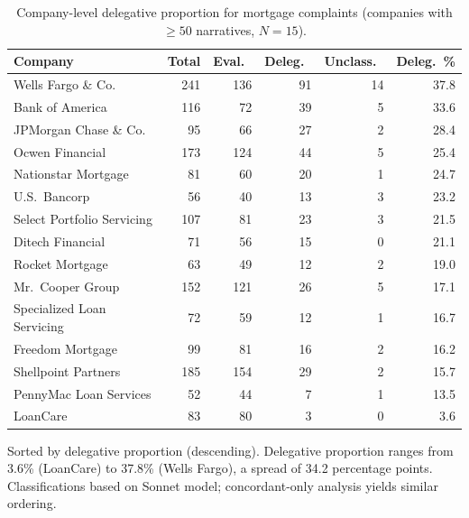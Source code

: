 
\begin{table}[H]
\centering
\begin{threeparttable}
\caption{Company-level delegative proportion for mortgage complaints (companies with $\geq 50$ narratives, $N = 15$).}
\label{tab:supp_company}
\begin{small}
\begin{tabular}{lrrrrr}
\toprule
Company & Total & Eval.\ & Deleg.\ & Unclass.\ & Deleg.\ \% \\
\midrule
Wells Fargo \& Co.          & 241 & 136 & 91 & 14 & 37.8 \\
Bank of America             & 116 &  72 & 39 &  5 & 33.6 \\
JPMorgan Chase \& Co.       &  95 &  66 & 27 &  2 & 28.4 \\
Ocwen Financial             & 173 & 124 & 44 &  5 & 25.4 \\
Nationstar Mortgage         &  81 &  60 & 20 &  1 & 24.7 \\
U.S.\ Bancorp               &  56 &  40 & 13 &  3 & 23.2 \\
Select Portfolio Servicing  & 107 &  81 & 23 &  3 & 21.5 \\
Ditech Financial            &  71 &  56 & 15 &  0 & 21.1 \\
Rocket Mortgage             &  63 &  49 & 12 &  2 & 19.0 \\
Mr.\ Cooper Group           & 152 & 121 & 26 &  5 & 17.1 \\
Specialized Loan Servicing  &  72 &  59 & 12 &  1 & 16.7 \\
Freedom Mortgage            &  99 &  81 & 16 &  2 & 16.2 \\
Shellpoint Partners         & 185 & 154 & 29 &  2 & 15.7 \\
PennyMac Loan Services      &  52 &  44 &  7 &  1 & 13.5 \\
LoanCare                    &  83 &  80 &  3 &  0 &  3.6 \\
\bottomrule
\end{tabular}
\end{small}
\begin{tablenotes}
\small
\item Sorted by delegative proportion (descending). Delegative proportion ranges from 3.6\% (LoanCare) to 37.8\% (Wells Fargo), a spread of 34.2 percentage points. Classifications based on Sonnet model; concordant-only analysis yields similar ordering.
\end{tablenotes}
\end{threeparttable}
\end{table}

